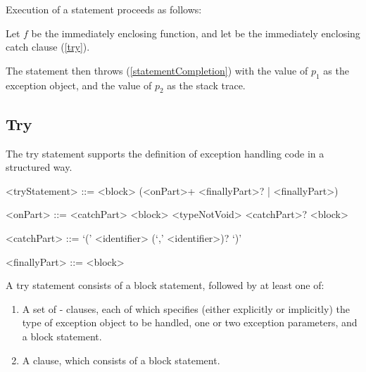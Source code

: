 \documentclass[makeidx]{article}
\begin{document}
{\LMHash{}%
Execution of a \code{\RETHROW} statement proceeds as follows:

\LMHash{}%
Let $f$ be the immediately enclosing function,
and let 
be the immediately enclosing catch clause (\ref{try}).


\LMHash{}%
The \RETHROW{} statement then throws (\ref{statementCompletion})
with the value of $p_1$ as the exception object,
and the value of $p_2$ as the stack trace.


\subsection{Try}

\LMHash{}%
The try statement supports the definition of exception handling code
in a structured way.

\begin{grammar}
<tryStatement> ::= \TRY{} <block> (<onPart>+ <finallyPart>? | <finallyPart>)

<onPart> ::= <catchPart> <block>
  \alt \ON{} <typeNotVoid> <catchPart>? <block>

<catchPart> ::= \CATCH{} `(' <identifier> (`,' <identifier>)? `)'

<finallyPart> ::= \FINALLY{} <block>
\end{grammar}

\LMHash{}%
A try statement consists of a block statement, followed by at least one of:

\begin{enumerate}
\item
  A set of \ON{}-\CATCH{} clauses, each of which specifies
  (either explicitly or implicitly)
  the type of exception object to be handled,
  one or two exception parameters,
  and a block statement.
\item
A \FINALLY{} clause, which consists of a block statement.
\end{enumerate}


}
\end{document}
